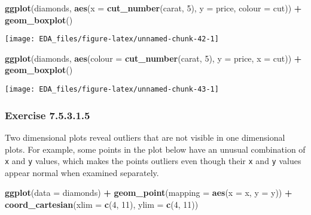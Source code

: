 \documentclass[]{book}
\newenvironment{Shaded}{\begin{snugshade}}{\end{snugshade}}
\newcommand{\DataTypeTok}[1]{\textcolor[rgb]{0.13,0.29,0.53}{#1}}
\newcommand{\DecValTok}[1]{\textcolor[rgb]{0.00,0.00,0.81}{#1}}
\newcommand{\KeywordTok}[1]{\textcolor[rgb]{0.13,0.29,0.53}{\textbf{#1}}}
\newcommand{\NormalTok}[1]{#1}
\newcommand{\OperatorTok}[1]{\textcolor[rgb]{0.81,0.36,0.00}{\textbf{#1}}}
\newcommand{\StringTok}[1]{\textcolor[rgb]{0.31,0.60,0.02}{#1}}
\theoremstyle{plain}
\theoremstyle{remark}
\begin{document}
\begin{Shaded}
\begin{Highlighting}[]
\KeywordTok{ggplot}\NormalTok{(diamonds, }\KeywordTok{aes}\NormalTok{(}\DataTypeTok{x =} \KeywordTok{cut_number}\NormalTok{(carat, }\DecValTok{5}\NormalTok{), }\DataTypeTok{y =}\NormalTok{ price, }\DataTypeTok{colour =}\NormalTok{ cut)) }\OperatorTok{+}
\StringTok{  }\KeywordTok{geom_boxplot}\NormalTok{()}
\end{Highlighting}
\end{Shaded}

\begin{center}\texttt{[image: EDA\_files/figure-latex/unnamed-chunk-42-1]} \end{center}

\begin{Shaded}
\begin{Highlighting}[]
\KeywordTok{ggplot}\NormalTok{(diamonds, }\KeywordTok{aes}\NormalTok{(}\DataTypeTok{colour =} \KeywordTok{cut_number}\NormalTok{(carat, }\DecValTok{5}\NormalTok{), }\DataTypeTok{y =}\NormalTok{ price, }\DataTypeTok{x =}\NormalTok{ cut)) }\OperatorTok{+}
\StringTok{  }\KeywordTok{geom_boxplot}\NormalTok{()}
\end{Highlighting}
\end{Shaded}

\begin{center}\texttt{[image: EDA\_files/figure-latex/unnamed-chunk-43-1]} \end{center}

\hypertarget{exercise-7.5.3.1.5}{%
\subsubsection*{\texorpdfstring{Exercise
{7.5.3.1.5}}{Exercise 7.5.3.1.5}}\label{exercise-7.5.3.1.5}}

Two dimensional plots reveal outliers that are not visible in one
dimensional plots. For example, some points in the plot below have an
unusual combination of \texttt{x} and \texttt{y} values, which makes the
points outliers even though their \texttt{x} and \texttt{y} values
appear normal when examined separately.

\begin{Shaded}
\begin{Highlighting}[]
\KeywordTok{ggplot}\NormalTok{(}\DataTypeTok{data =}\NormalTok{ diamonds) }\OperatorTok{+}
\StringTok{  }\KeywordTok{geom_point}\NormalTok{(}\DataTypeTok{mapping =} \KeywordTok{aes}\NormalTok{(}\DataTypeTok{x =}\NormalTok{ x, }\DataTypeTok{y =}\NormalTok{ y)) }\OperatorTok{+}
\StringTok{  }\KeywordTok{coord_cartesian}\NormalTok{(}\DataTypeTok{xlim =} \KeywordTok{c}\NormalTok{(}\DecValTok{4}\NormalTok{, }\DecValTok{11}\NormalTok{), }\DataTypeTok{ylim =} \KeywordTok{c}\NormalTok{(}\DecValTok{4}\NormalTok{, }\DecValTok{11}\NormalTok{))}
\end{Highlighting}
\end{Shaded}
\end{document}
